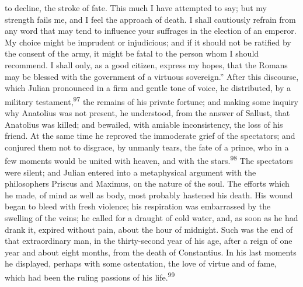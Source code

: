 to decline, the stroke of fate. This much I have attempted to
say; but my strength fails me, and I feel the approach of death.
I shall cautiously refrain from any word that may tend to
influence your suffrages in the election of an emperor. My choice
might be imprudent or injudicious; and if it should not be
ratified by the consent of the army, it might be fatal to the
person whom I should recommend. I shall only, as a good citizen,
express my hopes, that the Romans may be blessed with the
government of a virtuous sovereign.” After this discourse, which
Julian pronounced in a firm and gentle tone of voice, he
distributed, by a military testament,\textsuperscript{97} the remains of his
private fortune; and making some inquiry why Anatolius was not
present, he understood, from the answer of Sallust, that
Anatolius was killed; and bewailed, with amiable inconsistency,
the loss of his friend. At the same time he reproved the
immoderate grief of the spectators; and conjured them not to
disgrace, by unmanly tears, the fate of a prince, who in a few
moments would be united with heaven, and with the stars.\textsuperscript{98} The
spectators were silent; and Julian entered into a metaphysical
argument with the philosophers Priscus and Maximus, on the nature
of the soul. The efforts which he made, of mind as well as body,
most probably hastened his death. His wound began to bleed with
fresh violence; his respiration was embarrassed by the swelling
of the veins; he called for a draught of cold water, and, as soon
as he had drank it, expired without pain, about the hour of
midnight. Such was the end of that extraordinary man, in the
thirty-second year of his age, after a reign of one year and
about eight months, from the death of Constantius. In his last
moments he displayed, perhaps with some ostentation, the love of
virtue and of fame, which had been the ruling passions of his
life.\textsuperscript{99}



